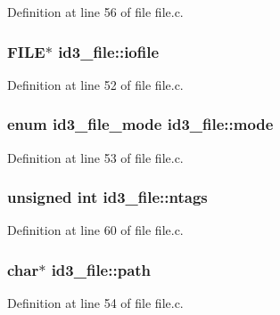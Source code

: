 Definition at line 56 of file file.\+c.

\subsubsection[{\texorpdfstring{iofile}{iofile}}]{\setlength{\rightskip}{0pt plus 5cm}F\+I\+LE$\ast$ id3\+\_\+file\+::iofile}\hypertarget{structid3__file_acb370428b9f0cf6764e27e1c3adce714}{}\label{structid3__file_acb370428b9f0cf6764e27e1c3adce714}


Definition at line 52 of file file.\+c.

\subsubsection[{\texorpdfstring{mode}{mode}}]{\setlength{\rightskip}{0pt plus 5cm}enum {\bf id3\+\_\+file\+\_\+mode} id3\+\_\+file\+::mode}\hypertarget{structid3__file_a64ac6baf94c23e214b857faff9006998}{}\label{structid3__file_a64ac6baf94c23e214b857faff9006998}


Definition at line 53 of file file.\+c.

\subsubsection[{\texorpdfstring{ntags}{ntags}}]{\setlength{\rightskip}{0pt plus 5cm}unsigned {\bf int} id3\+\_\+file\+::ntags}\hypertarget{structid3__file_ae2fd27e36e8d70ce01c12eae2e297d0e}{}\label{structid3__file_ae2fd27e36e8d70ce01c12eae2e297d0e}


Definition at line 60 of file file.\+c.

\subsubsection[{\texorpdfstring{path}{path}}]{\setlength{\rightskip}{0pt plus 5cm}char$\ast$ id3\+\_\+file\+::path}\hypertarget{structid3__file_a84f186fde30a49bda7c3af4400ff1792}{}\label{structid3__file_a84f186fde30a49bda7c3af4400ff1792}


Definition at line 54 of file file.\+c.

